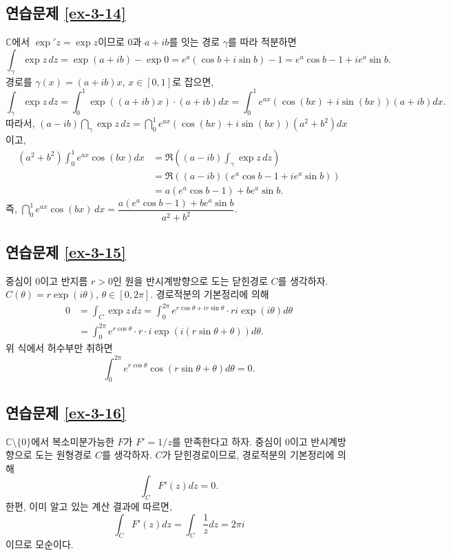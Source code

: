 \subsection*{연습문제 \ref{ex-3-14}}

$\mathbb C$에서  $\exp' z = \exp z$이므로
$0$과 $a+ib$를 잇는 경로 $\gamma$를 따라 적분하면
\[
\int_\gamma \exp z\, dz = \exp(a+ib) - \exp 0 = e^a(\cos b + i \sin b) -1
= e^a\cos b -1 +ie^a\sin b.
\]
 경로를 $\gamma(x) = (a+ib)x$, $x\in[0,1]$로 잡으면,
\[
\int_\gamma \exp z\, dz = \int_0^1 \exp((a+ib)x)\cdot (a+ib)dx
= \int_0^1 e^{ax}(\cos(bx) + i\sin(bx))(a+ib)dx.
\]
 따라서,
$(a-ib)\dint_\gamma \exp z\, dz = \dint_0^1 e^{ax}(\cos(bx) + i\sin(bx))(a^2+b^2)dx$이고,
\begin{align*}
(a^2+b^2) \int_0^1 e^{ax} \cos (bx)dx
&= \Re\left( (a-ib)\int_\gamma \exp z\, dz \right) \\
&= \Re((a-ib)(e^a\cos b -1 + ie^a\sin b)) \\
&= a(e^a\cos b -1) + be^a \sin b.
\end{align*}
즉,
$\dint_0^1 e^{ax}\cos(bx)\, dx = \dfrac{a(e^a\cos b - 1) + be^a\sin b}{a^2+b^2}$.

\subsection*{연습문제 \ref{ex-3-15}}

중심이 $0$이고 반지름 $r>0$인 원을 반시계방향으로 도는 닫힌경로 $C$를 생각하자.
$C(\theta) = r\exp(i\theta)$, $\theta\in[0,2\pi]$.
경로적분의 기본정리에 의해
\begin{align*}
0 & = \int_C \exp z \, dz = \int_0^{2\pi} e^{r\cos\theta +ir\sin\theta}
\cdot ri\exp(i\theta)d\theta\\
&= \int_0^{2\pi} e^{r\cos\theta} \cdot r\cdot i \exp(i(r\sin\theta +\theta))d\theta.
\end{align*}
위 식에서 허수부만 취하면
\[
\int_0^{2\pi} e^{r\cos\theta} \cos(r\sin \theta + \theta)d\theta = 0.
\]

\subsection*{연습문제 \ref{ex-3-16}}

$\mathbb C\setminus\{0\}$에서 복소미분가능한 $F$가 $F'=1/z$를 만족한다고 하자.
중심이 $0$이고 반시계방향으로 도는 원형경로 $C$를 생각하자.
$C$가 닫힌경로이므로, 경로적분의 기본정리에 의해
\[
\int_C F'(z)dz = 0.
\]
한편, 이미 알고 있는 계산 결과에 따르면,
\[
\int_C F'(z)dz = \int_C \dfrac1z dz = 2\pi i
\]
이므로 모순이다.

